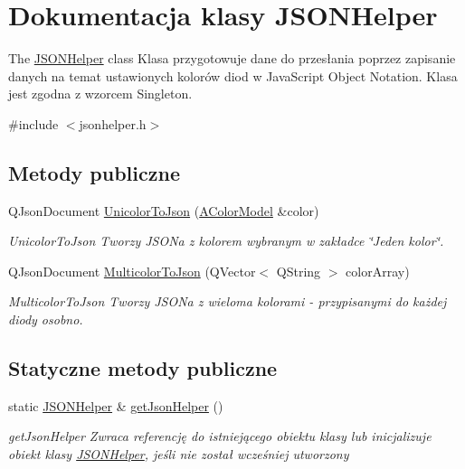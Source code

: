 \hypertarget{class_j_s_o_n_helper}{}\section{Dokumentacja klasy J\+S\+O\+N\+Helper}
\label{class_j_s_o_n_helper}


The \mbox{\hyperlink{class_j_s_o_n_helper}{J\+S\+O\+N\+Helper}} class Klasa przygotowuje dane do przesłania poprzez zapisanie danych na temat ustawionych kolorów diod w Java\+Script Object Notation. Klasa jest zgodna z wzorcem Singleton.  




{\ttfamily \#include $<$jsonhelper.\+h$>$}

\subsection*{Metody publiczne}
\begin{DoxyCompactItemize}
\item 
Q\+Json\+Document \mbox{\hyperlink{class_j_s_o_n_helper_a4d4771c06547925f86cd02abba8af913}{Unicolor\+To\+Json}} (\mbox{\hyperlink{class_a_color_model}{A\+Color\+Model}} \&color)
\begin{DoxyCompactList}\small\item\em Unicolor\+To\+Json Tworzy J\+S\+O\+Na z kolorem wybranym w zakładce \char`\"{}\+Jeden kolor\char`\"{}. \end{DoxyCompactList}\item 
Q\+Json\+Document \mbox{\hyperlink{class_j_s_o_n_helper_ab31e0865df49879496cbc07232ceb8ce}{Multicolor\+To\+Json}} (Q\+Vector$<$ Q\+String $>$ color\+Array)
\begin{DoxyCompactList}\small\item\em Multicolor\+To\+Json Tworzy J\+S\+O\+Na z wieloma kolorami -\/ przypisanymi do każdej diody osobno. \end{DoxyCompactList}\end{DoxyCompactItemize}
\subsection*{Statyczne metody publiczne}
\begin{DoxyCompactItemize}
\item 
static \mbox{\hyperlink{class_j_s_o_n_helper}{J\+S\+O\+N\+Helper}} \& \mbox{\hyperlink{class_j_s_o_n_helper_a16b59ed7de044a5f3e81cc2109d370a1}{get\+Json\+Helper}} ()
\begin{DoxyCompactList}\small\item\em get\+Json\+Helper Zwraca referencję do istniejącego obiektu klasy lub inicjalizuje obiekt klasy \mbox{\hyperlink{class_j_s_o_n_helper}{J\+S\+O\+N\+Helper}}, jeśli nie został wcześniej utworzony \end{DoxyCompactList}\end{DoxyCompactItemize}


